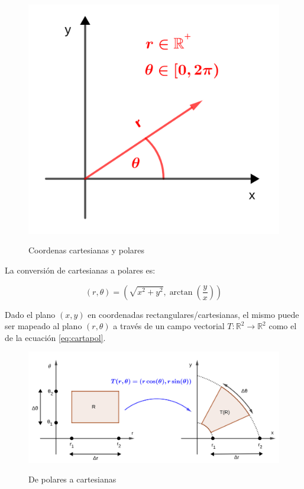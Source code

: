 \documentclass{article}
\renewcommand{\Bbb}{\mathbb}
\begin{document}
\begin{figure}[ht]
\centering
\caption{Coordenas cartesianas y polares}
\includegraphics[scale=0.8]{img/integrales/factor_escala_polares.png}
\label{fig:cp}
\end{figure}

La conversión de cartesianas a polares es:

\begin{equation}
(r, \theta) = \left( \sqrt{x^2 + y^2}, \arctan \left( \frac{y}{x} \right) \right)
\label{eq:cartapol}
\end{equation}

Dado el plano $(x,y)$ en coordenadas rectangulares/cartesianas, el mismo puede ser mapeado al plano $(r, \theta)$ a través de un campo vectorial $T:\Bbb R^2 \rightarrow \Bbb R^2$ como el de la ecuación \ref{eq:cartapol}.

\begin{figure}[ht]
\centering
\caption{De polares a cartesianas}
\includegraphics[scale=0.8]{img/integrales/cartapol.png}
\label{fig:polacart}
\end{figure}
\end{document}
